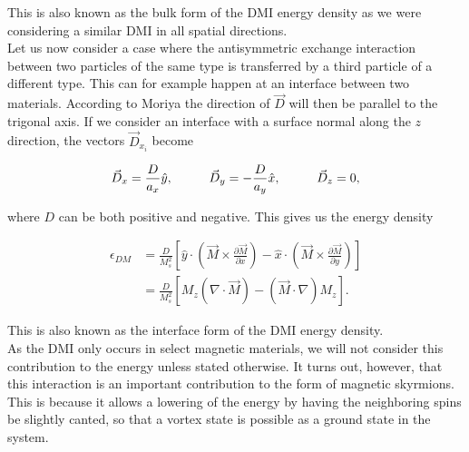 \documentclass[1p]{elsarticle}		%
\numberwithin{equation}{section}
\begin{document}
This is also known as the bulk form of the DMI energy density as we were considering a similar DMI in all spatial directions.\\
Let us now consider a case where the antisymmetric exchange interaction between two particles of the same type is transferred by a third particle of a different type. This can for example happen at an interface between two materials. According to Moriya the direction of $\vec{D}$ will then be parallel to the trigonal axis. If we consider an interface with a surface normal along the $z$ direction, the vectors $\vec{D}_{x_i}$ become

\begin{align}
\vec{D}_x = \frac{D}{a_x} \hat{y}, \hspace{10mm}
\vec{D}_y = - \frac{D}{a_y} \hat{x}, \hspace{10mm}
\vec{D}_z = 0,
\end{align}

where $D$ can be both positive and negative. This gives us the energy density

\begin{align}
\label{eq:InterfaceDMIe}
\epsilon_{DM} &= \frac{D}{M_s^2}\left[ \hat{y} \cdot(\vec{M}\times\frac{\partial\vec{M}}{\partial x}) - \hat{x} \cdot(\vec{M}\times\frac{\partial\vec{M}}{\partial y})\right] \\
&= \frac{D}{M_s^2}\left[ M_z (\nabla\cdot\vec{M}) - (\vec{M}\cdot\nabla)M_z\right]. \label{eq:IntDMI}
\end{align}

This is also known as the interface form of the DMI energy density. \\
As the DMI only occurs in select magnetic materials, we will not consider this contribution to the energy unless stated otherwise. It turns out, however, that this interaction is an important contribution to the form of magnetic skyrmions. This is because it allows a lowering of the energy by having the neighboring spins be slightly canted, so that a vortex state is possible as a ground state in the system.
\end{document}
